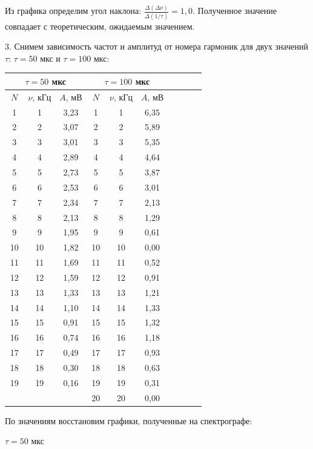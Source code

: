 \documentclass[14pt]{article}
\begin{document}
Из графика определим угол наклона: $\frac{\Delta(\Delta\nu)}{\Delta(1/\tau)} = 1,0$. Полученное значение совпадает с теоретическим, ожидаемым значением. 

3. Снимем зависимость частот и амплитуд от номера гармоник для двух значений $\tau$: $\tau = 50$ мкс и $\tau = 100$ мкс:

\begin{center}
\begin{tabular}{|c|c|c|c|c|c|c|c|c|c|}
\hline
\multicolumn{3}{|c|}{$\tau = 50$ мкс}&\multicolumn{3}{|c|}{$\tau = 100$ мкс}\\
\hline
$~N~$&$\nu$, кГц&$A$, мВ&$~N~$&$\nu$, кГц&$A$, мВ\\
\hline
1&1&3,23&1&1&6,35\\
\hline
2&2&3,07&2&2&5,89\\
\hline
3&3&3,01&3&3&5,35\\
\hline
4&4&2,89&4&4&4,64\\
\hline
5&5&2,73&5&5&3,87\\
\hline
6&6&2,53&6&6&3,01\\
\hline
7&7&2,34&7&7&2,13\\
\hline
8&8&2,13&8&8&1,29\\
\hline
9&9&1,95&9&9&0,61\\
\hline
10&10&1,82&10&10&0,00\\
\hline
11&11&1,69&11&11&0,52\\
\hline
12&12&1,59&12&12&0,91\\
\hline
13&13&1,33&13&13&1,21\\
\hline
14&14&1,10&14&14&1,33\\
\hline
15&15&0,91&15&15&1,32\\
\hline
16&16&0,74&16&16&1,18\\
\hline
17&17&0,49&17&17&0,93\\
\hline
18&18&0,30&18&18&0,63\\
\hline
19&19&0,16&19&19&0,31\\
\hline
&&&20&20&0,00\\
\hline
\end{tabular}
\end{center}

По значениям восстановим графики, полученные на спектрографе:

\vspace{1cm}
$\tau = 50$ мкс
\end{document}
